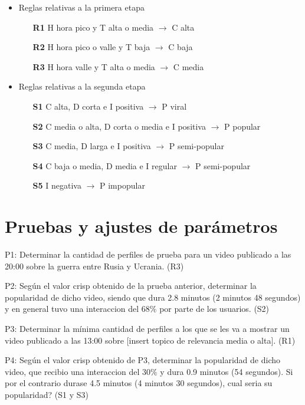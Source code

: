 \documentclass{article}
\begin{document}
\begin{itemize}
	\item Reglas relativas a la primera etapa
	\begin{itemize}
		\item [\textbf{R1}] H hora pico y T alta o media $\rightarrow$ C alta 
		\item [\textbf{R2}] H hora pico o valle y T baja $\rightarrow$ C baja 
		\item [\textbf{R3}] H hora valle y T alta o media $\rightarrow$ C media 
	\end{itemize}
	\item Reglas relativas a la segunda etapa
	\begin{itemize}
		\item [\textbf{S1}] C alta, D corta e I positiva $\rightarrow$ P viral
		\item [\textbf{S2}] C media o alta, D corta o media e I positiva $\rightarrow$ P popular
		\item [\textbf{S3}] C media, D larga e I positiva $\rightarrow$ P semi-popular
		\item [\textbf{S4}] C baja o media, D media e I regular $\rightarrow$ P semi-popular
		\item [\textbf{S5}] I negativa $\rightarrow$ P impopular
	\end{itemize}
\end{itemize}

\section{Pruebas y ajustes de parámetros}

 P1: Determinar la cantidad de perfiles de prueba para un video publicado a las 20:00 sobre la guerra entre Rusia y Ucrania. (R3)

 P2: Según el valor crisp obtenido de la prueba anterior, determinar la popularidad de dicho video, siendo que dura 2.8 minutos (2 minutos 48 segundos) y en general tuvo una interaccion del $68\%$ por parte de los usuarios. (S2)

 P3: Determinar la mínima cantidad de perfiles a los que se les va a mostrar un video publicado a las 13:00 sobre [insert topico de relevancia media o alta]. (R1)

 P4: Según el valor crisp obtenido de P3, determinar la popularidad de dicho video, que recibio una interaccion del $30\%$ y dura 0.9 minutos (54 segundos). Si por el contrario durase 4.5 minutos (4 minutos 30 segundos), cual seria su popularidad? (S1 y S3)
\end{document}
